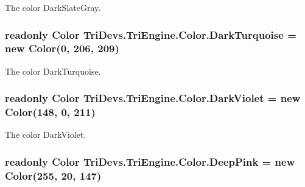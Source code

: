 The color Dark\-Slate\-Gray. 

\hypertarget{struct_tri_devs_1_1_tri_engine_1_1_color_a328b83e3c52e00f60170eb567416c6e1}{
\subsubsection[{Dark\-Turquoise}]{\setlength{\rightskip}{0pt plus 5cm}readonly {\bf Color} Tri\-Devs.\-Tri\-Engine.\-Color.\-Dark\-Turquoise = new {\bf Color}(0, 206, 209)\hspace{0.3cm}{\ttfamily [static]}}}\label{struct_tri_devs_1_1_tri_engine_1_1_color_a328b83e3c52e00f60170eb567416c6e1}


The color Dark\-Turquoise. 

\hypertarget{struct_tri_devs_1_1_tri_engine_1_1_color_a7eec7ad88791ffb62aeb5f6395c5ff89}{
\subsubsection[{Dark\-Violet}]{\setlength{\rightskip}{0pt plus 5cm}readonly {\bf Color} Tri\-Devs.\-Tri\-Engine.\-Color.\-Dark\-Violet = new {\bf Color}(148, 0, 211)\hspace{0.3cm}{\ttfamily [static]}}}\label{struct_tri_devs_1_1_tri_engine_1_1_color_a7eec7ad88791ffb62aeb5f6395c5ff89}


The color Dark\-Violet. 

\hypertarget{struct_tri_devs_1_1_tri_engine_1_1_color_a8189ae3da744cacf9a3a51be83d3a43f}{
\subsubsection[{Deep\-Pink}]{\setlength{\rightskip}{0pt plus 5cm}readonly {\bf Color} Tri\-Devs.\-Tri\-Engine.\-Color.\-Deep\-Pink = new {\bf Color}(255, 20, 147)\hspace{0.3cm}{\ttfamily [static]}}}\label{struct_tri_devs_1_1_tri_engine_1_1_color_a8189ae3da744cacf9a3a51be83d3a43f}


